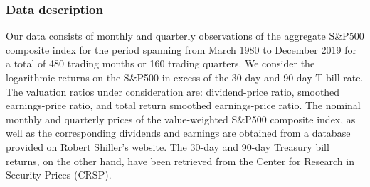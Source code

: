\documentclass[harvard,11pt]{article}
\begin{document}
\subsubsection{Data description}

Our data consists of monthly and quarterly observations of the aggregate S\&P500 composite index for the period spanning from March 1980 to December 2019 for a total of 480 trading months or 160 trading quarters. We consider the logarithmic returns on the S\&P500 in excess of the 30-day and 90-day T-bill rate. The valuation ratios under consideration are: dividend-price ratio, smoothed earnings-price ratio, and total return smoothed earnings-price ratio. The nominal monthly and quarterly prices of the value-weighted S\&P500 composite index, as well as the corresponding dividends and earnings are obtained from a database provided on Robert Shiller's website. The 30-day and 90-day Treasury bill returns, on the other hand, have been retrieved from the Center for Research in Security Prices (CRSP). 
\end{document}
